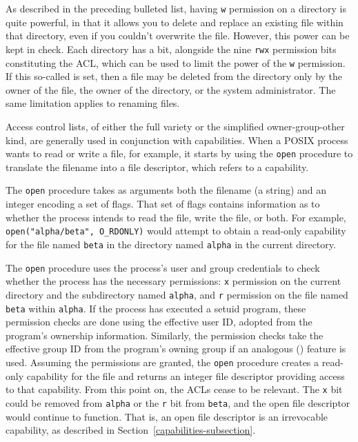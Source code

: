 As described in the preceding bulleted list, having \texttt{w} permission on a
directory is quite powerful, in that it allows you to delete and
replace an existing file within
that directory, even if you couldn't overwrite the file.  However,
this power can be kept in check.  Each directory has a bit, alongside the
nine \texttt{rwx} permission bits constituting the ACL, which can be used to limit the
power of the \texttt{w} permission.  If this so-called  is
set, then a file may be deleted from the directory only by the owner
of the file, the owner of the directory, or the system administrator.
The same limitation applies to renaming files.

Access control lists, of either the full variety or the simplified
owner-group-other kind, are generally used in conjunction with
capabilities.  When a POSIX process wants to read or write a file, for
example, it starts by using the \verb|open| procedure to translate the
filename into a file descriptor, which refers to a capability.

The \verb|open| procedure takes as arguments both the filename (a
string) and an integer encoding a set of flags.  That set of flags
contains information as to whether the process intends to read the
file, write the file, or both.  For example,
\verb|open("alpha/beta", O_RDONLY)| would attempt to obtain a read-only
capability for the file named \verb|beta| in the directory named
\verb|alpha| in the current directory.

The \verb|open| procedure uses the process's user and group
credentials to check whether the process has the necessary
permissions: \verb|x| permission on the current directory and the
subdirectory named \verb|alpha|, and \verb|r| permission on the file
named \verb|beta| within \verb|alpha|.  If the process has executed a setuid
program, these permission checks are done using the
effective user ID, adopted from the program's ownership
information.  Similarly, the permission checks take the effective
group ID from the program's owning group
if an analogous  ()
feature is used.  Assuming the permissions are granted, the \verb|open|
procedure creates a read-only capability for the file and returns an
integer file descriptor providing access to that capability.  From
this point on, the ACLs cease to be relevant.  The \verb|x| bit could
be removed from \verb|alpha| or the \verb|r| bit from \verb|beta|, and
the open file descriptor would continue to function.  That is, an open
file descriptor is an irrevocable capability, as described in
Section~\ref{capabilities-subsection}.

